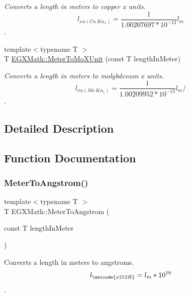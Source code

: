 \begin{DoxyCompactItemize}
\begin{DoxyCompactList}\small\item\em Converts a length in meters to copper x units. \[ l_{xu(Cu\ K\alpha_1)}= \frac{1}{1.00207697*10^{-13}} l_{m} \]. \end{DoxyCompactList}\item 
{\footnotesize template$<$typename T $>$ }\\T \mbox{\hyperlink{group___e_g_x_math-_conversions-_length_conversions-_meter-_non-_s_i_gae0351200a3d90c4efe741c6057b2fd4b}{E\+G\+X\+Math\+::\+Meter\+To\+Mo\+X\+Unit}} (const T length\+In\+Meter)
\begin{DoxyCompactList}\small\item\em Converts a length in meters to molybdenum x units. \[ l_{xu(Mo\ K\alpha_1)}=\frac{1}{1.00209952*10^{-13}} l_{m} / \]. \end{DoxyCompactList}\end{DoxyCompactItemize}


\subsection{Detailed Description}


\subsection{Function Documentation}
\mbox{\label{group___e_g_x_math-_conversions-_length_conversions-_meter-_non-_s_i_ga9e6d5040f58d167bd7a4b6cebb5527ee}} 
\subsubsection{\texorpdfstring{Meter\+To\+Angstrom()}{MeterToAngstrom()}}
{\footnotesize\ttfamily template$<$typename T $>$ \\
T E\+G\+X\+Math\+::\+Meter\+To\+Angstrom (\begin{DoxyParamCaption}\item[{const T}]{length\+In\+Meter }\end{DoxyParamCaption})}



Converts a length in meters to angstroms. \[ l_{\unicode{x212B}}=l_{m} * 10^{10} \]. 

